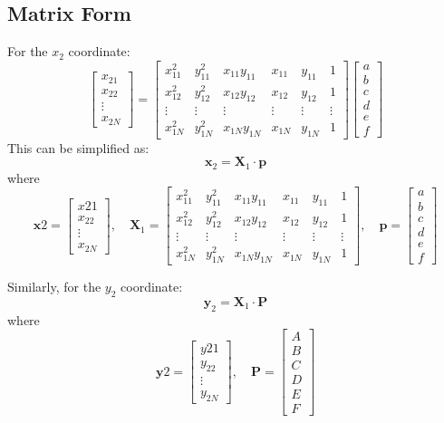 \documentclass{article}
\begin{document}
\subsection*{Matrix Form}
For the \(x_2\) coordinate:
\[
\begin{bmatrix}
x_{21} \\
x_{22} \\
\vdots \\
x_{2N}
\end{bmatrix}
=
\begin{bmatrix}
x_{11}^2 & y_{11}^2 & x_{11}y_{11} & x_{11} & y_{11} & 1 \\
x_{12}^2 & y_{12}^2 & x_{12}y_{12} & x_{12} & y_{12} & 1 \\
\vdots & \vdots & \vdots & \vdots & \vdots & \vdots \\
x_{1N}^2 & y_{1N}^2 & x_{1N}y_{1N} & x_{1N} & y_{1N} & 1
\end{bmatrix}
\begin{bmatrix}
a \\
b \\
c \\
d \\
e \\
f
\end{bmatrix}
\]
This can be simplified as:
\[
\mathbf{x}_2 = \mathbf{X}_1 \cdot \mathbf{p}
\]
where
\[
\mathbf{x}2 = \begin{bmatrix} x{21} \\ x_{22} \\ \vdots \\ x_{2N} \end{bmatrix}, \quad
\mathbf{X}_1 = \begin{bmatrix}
x_{11}^2 & y_{11}^2 & x_{11}y_{11} & x_{11} & y_{11} & 1 \\
x_{12}^2 & y_{12}^2 & x_{12}y_{12} & x_{12} & y_{12} & 1 \\
\vdots & \vdots & \vdots & \vdots & \vdots & \vdots \\
x_{1N}^2 & y_{1N}^2 & x_{1N}y_{1N} & x_{1N} & y_{1N} & 1
\end{bmatrix}, \quad
\mathbf{p} = \begin{bmatrix} a \\ b \\ c \\ d \\ e \\ f \end{bmatrix}
\]

Similarly, for the \(y_2\) coordinate:
\[
\mathbf{y}_2 = \mathbf{X}_1 \cdot \mathbf{P}
\]
where
\[
\mathbf{y}2 = \begin{bmatrix} y{21} \\ y_{22} \\ \vdots \\ y_{2N} \end{bmatrix}, \quad
\mathbf{P} = \begin{bmatrix} A \\ B \\ C \\ D \\ E \\ F \end{bmatrix}
\]
\end{document}
